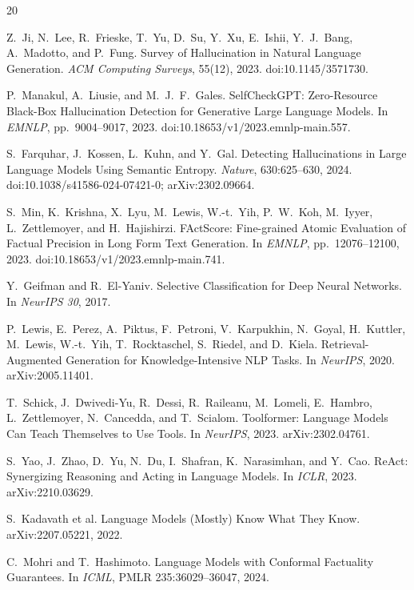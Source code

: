 \documentclass[10pt,twocolumn]{article}
\begin{document}

\begin{sloppypar}
\begin{thebibliography}{20}

 Z.~Ji, N.~Lee, R.~Frieske, T.~Yu, D.~Su, Y.~Xu, E.~Ishii, Y.~J.~Bang, A.~Madotto, and P.~Fung. Survey of Hallucination in Natural Language Generation. \emph{ACM Computing Surveys}, 55(12), 2023. doi:10.1145/3571730.

 P.~Manakul, A.~Liusie, and M.~J.~F.~Gales. SelfCheckGPT: Zero-Resource Black-Box Hallucination Detection for Generative Large Language Models. In \emph{EMNLP}, pp.\ 9004--9017, 2023. doi:10.18653/v1/2023.emnlp-main.557.

 S.~Farquhar, J.~Kossen, L.~Kuhn, and Y.~Gal. Detecting Hallucinations in Large Language Models Using Semantic Entropy. \emph{Nature}, 630:625--630, 2024. doi:10.1038/s41586-024-07421-0; arXiv:2302.09664.

 S.~Min, K.~Krishna, X.~Lyu, M.~Lewis, W.-t.~Yih, P.~W.~Koh, M.~Iyyer, L.~Zettlemoyer, and H.~Hajishirzi. FActScore: Fine-grained Atomic Evaluation of Factual Precision in Long Form Text Generation. In \emph{EMNLP}, pp.\ 12076--12100, 2023. doi:10.18653/v1/2023.emnlp-main.741.

 Y.~Geifman and R.~El-Yaniv. Selective Classification for Deep Neural Networks. In \emph{NeurIPS 30}, 2017.

 P.~Lewis, E.~Perez, A.~Piktus, F.~Petroni, V.~Karpukhin, N.~Goyal, H.~Kuttler, M.~Lewis, W.-t.~Yih, T.~Rocktaschel, S.~Riedel, and D.~Kiela. Retrieval-Augmented Generation for Knowledge-Intensive NLP Tasks. In \emph{NeurIPS}, 2020. arXiv:2005.11401.

 T.~Schick, J.~Dwivedi-Yu, R.~Dessi, R.~Raileanu, M.~Lomeli, E.~Hambro, L.~Zettlemoyer, N.~Cancedda, and T.~Scialom. Toolformer: Language Models Can Teach Themselves to Use Tools. In \emph{NeurIPS}, 2023. arXiv:2302.04761.

 S.~Yao, J.~Zhao, D.~Yu, N.~Du, I.~Shafran, K.~Narasimhan, and Y.~Cao. ReAct: Synergizing Reasoning and Acting in Language Models. In \emph{ICLR}, 2023. arXiv:2210.03629.

 S.~Kadavath et al. Language Models (Mostly) Know What They Know. arXiv:2207.05221, 2022.

 C.~Mohri and T.~Hashimoto. Language Models with Conformal Factuality Guarantees. In \emph{ICML}, PMLR 235:36029--36047, 2024.


\end{thebibliography}
\end{sloppypar}
\end{document}
